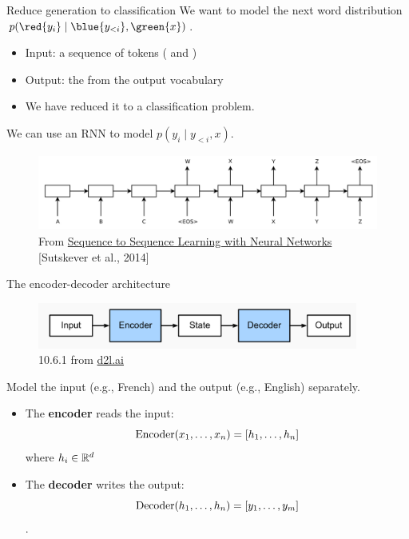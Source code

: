 \documentclass[usenames,dvipsnames,notes,11pt,aspectratio=169,hyperref={colorlinks=true, linkcolor=blue}]{beamer}
\begin{document}
\begin{frame}
    {Reduce generation to classification}
    We want to model the {next word distribution} $p(\red{y_i}\mid \blue{y_{<i}}, \green{x})$.\\
    \begin{itemize}[<+->]
        \item Input: a sequence of tokens ( and )
        \item Output: the  from the output vocabulary
        \item We have reduced it to a classification problem.
    \end{itemize}

    \pause
    We can use an RNN to model $p(y_i\mid {y_{<i}}, {x})$.
    \begin{figure}
        \includegraphics[height=2.5cm]{figures/s2s-ilya}
        \caption{From \href{https://arxiv.org/abs/1409.3215}{Sequence to Sequence Learning with Neural Networks} [Sutskever et al., 2014]}
    \end{figure}
\end{frame}

\begin{frame}
    {The encoder-decoder architecture}
    \begin{figure}
        \includegraphics[height=1.5cm]{figures/enc-dec}
        \caption{10.6.1 from \href{https://d2l.ai/chapter_recurrent-modern/encoder-decoder.html}{d2l.ai}}
    \end{figure}
    \vspace{-1em}

    Model the {input} (e.g., French) and the {output} (e.g., English) separately.\\
    \pause
    \begin{itemize}
        \item The \textbf{encoder} reads the input:
            $$
            \mathrm{Encoder}(x_1,\ldots,x_n) = \left[ h_1,\ldots,h_n \right]$$ where $h_i\in\mathbb{R}^d$
        \item The \textbf{decoder}  writes the output:
            $$\mathrm{Decoder}(h_1,\ldots,h_n) = \left[ y_1,\ldots, y_m \right]$$.
    \end{itemize}
\end{frame}
\end{document}
